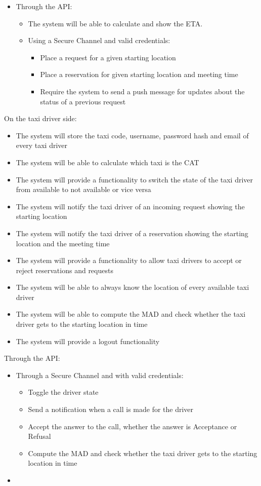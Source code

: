 \documentclass{article}
\begin{document}
\begin{itemize}
\begin{itemize}
		\end{itemize}
	\item Through the API:\@ 
		\begin{itemize}
			\item The system will be able to calculate and show the ETA.\@ 
			\item Using a Secure Channel and valid credentials:\@
				\begin{itemize}
					\item Place a request for a given starting location
					\item Place a reservation for given starting location and meeting time
					\item Require the system to send a push message for updates about the status of a previous request
				\end{itemize}
		\end{itemize}
\end{itemize}
On the taxi driver side:\@ 
\begin{itemize}
	\item The system will store the taxi code, username, password hash and email of every taxi driver
	\item The system will be able to calculate which taxi is the CAT
	\item The system will provide a functionality to switch the state of the taxi driver from available to not available or vice versa
	\item The system will notify the taxi driver of an incoming request showing the starting location
	\item The system will notify the taxi driver of a reservation showing the starting location and the meeting time
	\item The system will provide a functionality to allow taxi drivers to accept or reject reservations and requests
	\item The system will be able to always know the location of every available taxi driver
	\item The system will be able to compute the MAD and check whether the taxi driver gets to the starting location in time 
	\item The system will provide a logout functionality
\end{itemize}
Through the API:\@
\begin{itemize}
	\item Through a Secure Channel and with valid credentials:\@
		\begin{itemize}
			\item Toggle the driver state
			\item Send a notification when a call is made for the driver
			\item Accept the answer to the call, whether the answer is Acceptance or Refusal
			\item Compute the MAD and check whether the taxi driver gets to the starting location in time 
		\end{itemize}
	\item 
\end{itemize}
\end{document}
